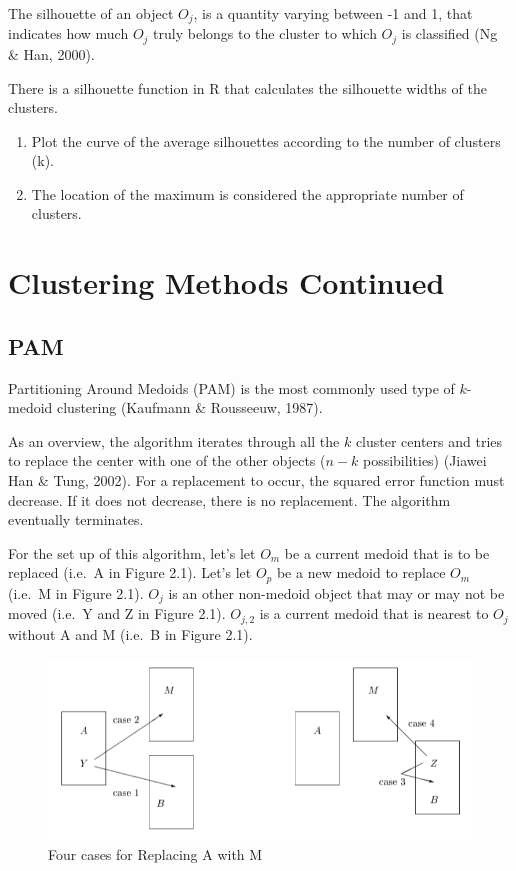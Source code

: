 \documentclass[12pt,twoside]{amherstthesis}
\begin{document}
  The silhouette of an object \(O_j\), is a quantity varying between -1
  and 1, that indicates how much \(O_j\) truly belongs to the cluster to
  which \(O_j\) is classified (Ng \& Han, 2000).
  
  There is a silhouette function in R that calculates the silhouette
  widths of the clusters.
  
  \begin{enumerate}
  \def\labelenumi{\arabic{enumi}.}
  \setcounter{enumi}{2}
  \item
    Plot the curve of the average silhouettes according to the number of
    clusters (k).
  \item
    The location of the maximum is considered the appropriate number of
    clusters.
  \end{enumerate}
  
  \chapter{Clustering Methods Continued}\label{typeset-equ}
  
  \section{PAM}\label{pam}
  
  Partitioning Around Medoids (PAM) is the most commonly used type of
  \(k\)-medoid clustering (Kaufmann \& Rousseeuw, 1987).
  
  As an overview, the algorithm iterates through all the \(k\) cluster
  centers and tries to replace the center with one of the other objects
  (\(n-k\) possibilities) (Jiawei Han \& Tung, 2002). For a replacement to
  occur, the squared error function must decrease. If it does not
  decrease, there is no replacement. The algorithm eventually terminates.
  
  For the set up of this algorithm, let's let \(O_m\) be a current medoid
  that is to be replaced (i.e.~A in Figure 2.1). Let's let \(O_p\) be a
  new medoid to replace \(O_m\) (i.e.~M in Figure 2.1). \(O_j\) is an
  other non-medoid object that may or may not be moved (i.e.~Y and Z in
  Figure 2.1). \(O_{j,2}\) is a current medoid that is nearest to \(O_j\)
  without A and M (i.e.~B in Figure 2.1).
  
  \begin{figure}[htbp]
  \centering
  \includegraphics[scale = 0.5,angle = 0]{PAM_pic.png}
  \caption[Four cases for Replacing A with M]{\normalsize{Four cases for Replacing A with M}}
  \label{fig:PAM}
  \end{figure}
  
\end{document}
